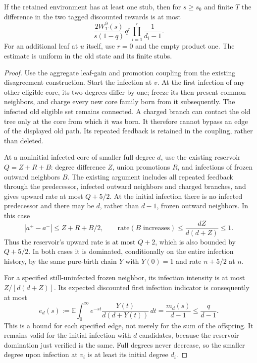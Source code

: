 \begin{lemma}
\label{cr:directional}
If the retained environment has at least one stub, then for $s\ge s_0$
and finite $T$ the difference in the two tagged discounted rewards is
at most
\begin{equation}
 \frac{2W_T^\partial(s)}{s(1-q)}
 q^r\prod_{i=1}^r\frac1{d_i-1}.
 \label{cr:directional-bound}
\end{equation}
For an additional leaf at $u$ itself, use $r=0$ and the empty product
one.  The estimate is uniform in the old state and its finite stubs.
\end{lemma}
\begin{proof}
Use the aggregate leaf-gain and promotion coupling from the existing
disagreement construction.  Start the infection at $v$.  At the first
infection of any other eligible core, its two degrees differ by one;
freeze its then-present common neighbors, and charge every new core
family born from it subsequently.  The infected old eligible set
remains connected.  A charged branch can contact the old tree only
at the core from which it was born.  It therefore cannot bypass an
edge of the displayed old path.  Its repeated feedback is retained
in the coupling, rather than deleted.

At a noninitial infected core of smaller full degree $d$, use the
existing reservoir $Q=Z+R+B$: degree difference $Z$, union promotions
$R$, and infections of frozen outward neighbors $B$.  The existing
argument includes all repeated feedback through the predecessor,
infected outward neighbors and charged branches, and gives upward
rate at most $Q+5/2$.  At the initial infection there is no infected
predecessor and there may be $d$, rather than $d-1$, frozen outward
neighbors.  In this case
\[
 |a^+-a^-|\le Z+R+B/2,
 \qquad \text{rate}(B\text{ increases})
 \le \frac{dZ}{d(d+Z)}\le1.
\]
Thus the reservoir's upward rate is at most $Q+2$, which is also
bounded by $Q+5/2$.  In both cases it is dominated, conditionally on
the entire infection history, by the same pure-birth chain $Y$ with
$Y(0)=1$ and rate $n+5/2$ at $n$.

For a specified still-uninfected frozen neighbor, its infection
intensity is at most $Z/[d(d+Z)]$.  Its expected discounted first
infection indicator is consequently at most
\[
 e_d(s):=\mathbb E\int_0^\infty
 e^{-st}\frac{Y(t)}{d(d+Y(t))}\,dt
 =\frac{m_d(s)}{d-1}\le\frac q{d-1}.
\]
This is a bound for each specified edge, not merely for the sum of
the offspring.  It remains valid for the initial infection with $d$
candidates, because the reservoir domination just verified is the
same.  Full degrees never decrease, so the smaller degree upon
infection at $v_i$ is at least its initial degree $d_i$.


\end{proof}
